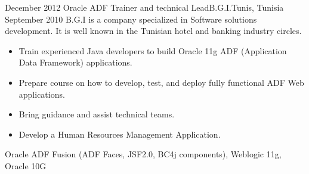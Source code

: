 \begin{experiences}
  \emptySeparator
  \experience
    {December 2012}   {Oracle ADF Trainer and technical Lead}{B.G.I.}{Tunis, Tunisia}
    {September 2010} {B.G.I is a company specialized in Software solutions development. It is well known in the Tunisian hotel and banking industry circles.}
                    {
                      \begin{itemize}
                        \item Train experienced Java developers to build Oracle 11g ADF (Application Data Framework) applications.
                        \item Prepare course on how to develop, test, and deploy fully functional ADF Web applications.
                        \item Bring guidance and assist technical teams.
                        \item Develop a Human Resources Management Application.
                      \end{itemize}
                    }
                    {Oracle ADF Fusion (ADF Faces, JSF2.0, BC4j components), Weblogic 11g, Oracle 10G}
  \emptySeparator
\end{experiences}
